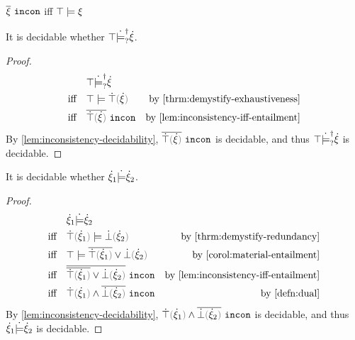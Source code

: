 \begin{lemma}
  \label{lem:inconsistency-iff-entailment}
  $\overline{\xi} ~\mathtt{incon}$ iff $\top \models \xi$
\end{lemma}

\begin{theorem}
\label{thrm:exhaustiveness-decidability}
It is decidable whether $\top \dot{\models}_{?}^{\dag} \dot{\xi}$.
\end{theorem}
\begin{proof}
  \begin{align*}
               & \csatisfyormay{\ctruth}{\hxi} & \\
    \text{iff} \quad& \ccsatisfy{\ctruth}{\ctruify{\hxi}} & \text{by \autoref{thrm:demystify-exhaustiveness}} \\
    \text{iff} \quad& \cincon{\cdual{\ctruify{\hxi}}} & \text{by \autoref{lem:inconsistency-iff-entailment}}
  \end{align*}
  By \autoref{lem:inconsistency-decidability}, $\cincon{\cdual{\ctruify{\hxi}}}$ is decidable, and thus $\top \dot{\models}_{?}^{\dag} \dot{\xi}$ is decidable.
\end{proof}

\begin{theorem}
\label{thrm:redundancy-decidability}
It is decidable whether $\dot{\xi}_1 \dot{\models} \dot{\xi}_2$.
\end{theorem}
\begin{proof}
  \begin{align*}
               & \csatisfy{\hxi_1}{\hxi_2} & \\
    \text{iff} \quad& \ccsatisfy{\ctruify{\hxi_1}}{\cfalsify{\hxi_2}} & \text{by \autoref{thrm:demystify-redundancy}} \\
    \text{iff} \quad& \ccsatisfy{\ctruth}{\cor{\cdual{\ctruify{\hxi_1}}}{\cfalsify{\hxi_2}}} & \text{by \autoref{corol:material-entailment}}\\
    \text{iff} \quad& \cincon{\cdual{\cor{\cdual{\ctruify{\hxi_1}}}{\cfalsify{\hxi_2}}}} & \text{by \autoref{lem:inconsistency-iff-entailment}} \\
    \text{iff} \quad& \cincon{\cand{\ctruify{\hxi_1}}{\cdual{\cfalsify{\hxi_2}}}} & \text{by \autoref{defn:dual}}
  \end{align*}
  By \autoref{lem:inconsistency-decidability}, $\cincon{\cand{\ctruify{\hxi_1}}{\cdual{\cfalsify{\hxi_2}}}}$ is decidable, and thus $\dot{\xi}_1 \dot{\models} \dot{\xi}_2$ is decidable.
\end{proof}